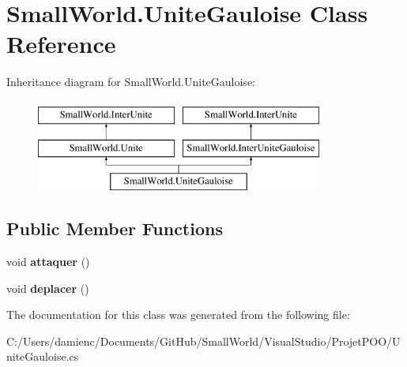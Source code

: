 \hypertarget{class_small_world_1_1_unite_gauloise}{\section{Small\-World.\-Unite\-Gauloise Class Reference}
\label{class_small_world_1_1_unite_gauloise}
}
Inheritance diagram for Small\-World.\-Unite\-Gauloise\-:\begin{figure}[H]
\begin{center}
\leavevmode
\includegraphics[height=3.000000cm]{class_small_world_1_1_unite_gauloise}
\end{center}
\end{figure}
\subsection*{Public Member Functions}
\begin{DoxyCompactItemize}
\item 
\hypertarget{class_small_world_1_1_unite_gauloise_a720db2403789106f4439a0601bbba9c5}{void {\bfseries attaquer} ()}\label{class_small_world_1_1_unite_gauloise_a720db2403789106f4439a0601bbba9c5}

\item 
\hypertarget{class_small_world_1_1_unite_gauloise_a1b925bc9484a883159a749c6ce8ceac4}{void {\bfseries deplacer} ()}\label{class_small_world_1_1_unite_gauloise_a1b925bc9484a883159a749c6ce8ceac4}

\end{DoxyCompactItemize}


The documentation for this class was generated from the following file\-:\begin{DoxyCompactItemize}
\item 
C\-:/\-Users/damienc/\-Documents/\-Git\-Hub/\-Small\-World/\-Visual\-Studio/\-Projet\-P\-O\-O/Unite\-Gauloise.\-cs\end{DoxyCompactItemize}
